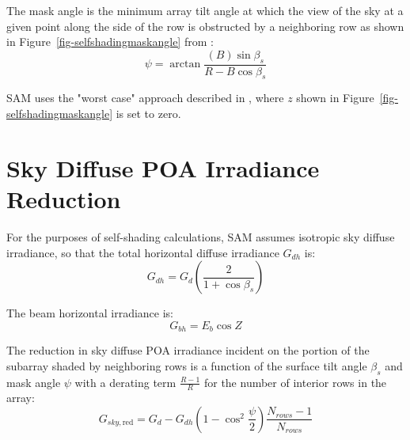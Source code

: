 \documentclass[12pt,letterpaper]{article}
\begin{document}
The mask angle is the minimum array tilt angle at which the view of the sky at a given point along the side of the row is obstructed by a neighboring row as shown in Figure~\ref{fig-selfshadingmaskangle} from \citet{passias1984}:
\begin{equation}
\psi = \arctan \frac{ (B)\sin\beta_s } { R - B\cos\beta_s }
\end{equation}

SAM uses the "worst case" approach described in \citep{deline2013b}, where $z$ shown in Figure~\ref{fig-selfshadingmaskangle} is set to zero.

\section{Sky Diffuse POA Irradiance Reduction} \label{sec-selfshaddiff}

For the purposes of self-shading calculations, SAM assumes isotropic sky diffuse irradiance, so that the total horizontal diffuse irradiance $G_{dh}$ is:
\begin{equation}\label{eqn-selfshaddiffhor}
G_{dh} = G_d \left(\frac{2}{1+\cos\beta_s}\right)
\end{equation}

The beam horizontal irradiance is:
\begin{equation}
G_{bh} = E_b\cos Z 
\end{equation}



The reduction in sky diffuse POA irradiance incident on the portion of the subarray shaded by neighboring rows is a function of the surface tilt angle $\beta_s$ and mask angle $\psi$ with a derating term $\frac{R-1}{R}$ for the number of interior rows in the array:
\begin{equation}\label{eqn-selfshad-skydiff2}
G_{sky,\text{red}} = G_d - G_{dh}\left(1 - \cos^2\frac{\psi}{2}\right)\frac{N_{rows} - 1}{N_{rows}}
\end{equation}
\end{document}
